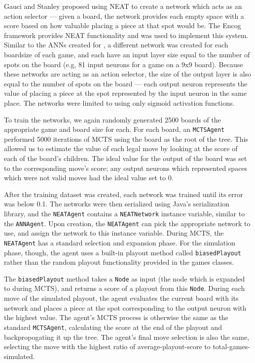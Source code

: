 Gauci and Stanley proposed using NEAT to create a network which acts as an action selector --- given a board, the network provides each empty space with a score based on how valuable placing a piece at that spot would be.  The Encog framework \cite{encog} provides NEAT functionality and was used to implement this system.  Similar to the ANNs created for \cite{ANNAgent}, a different network was created for each boardsize of each game, and each have an input layer size equal to the number of spots on the board (e.g, 81 input neurons for a game on a 9x9 board).  Because these networks are acting as an action selector, the size of the output layer is also equal to the number of spots on the board --- each output neuron represents the value of placing a piece at the spot represented by the input neuron in the same place.  The networks were limited to using only sigmoid activation functions.

To train the networks, we again randomly generated 2500 boards of the appropriate game and board size for each.  For each board, an \texttt{MCTSAgent} performed 5000 iterations of MCTS using the board as the root of the tree.  This allowed us to estimate the value of each legal move by looking at the score of each of the board's children.  The ideal value for the output of the board was set to the corresponding move's score; any output neurons which represented spaces which were not valid moves had the ideal value set to 0.  

After the training dataset was created, each network was trained until its error was below 0.1.  The networks were then serialized using Java's serialization library, and the \texttt{NEATAgent} contains a \texttt{NEATNetwork} instance variable, similar to the \texttt{ANNAgent}.  Upon creation, the \texttt{NEATAgent} can pick the appropriate network to use, and assign the network to this instance variable.  During MCTS, the \texttt{NEATAgent} has a standard selection and expansion phase.  For the simulation phase, though, the agent uses a built-in playout method called \texttt{biasedPlayout} rather than the random playout functionality provided in the games classes.

The \texttt{biasedPlayout} method takes a \texttt{Node} as input (the node which is expanded to during MCTS), and returns a score of a playout from this \texttt{Node}.  During each move of the simulated playout, the agent evaluates the current board with its network and places a piece at the spot corresponding to the output neuron with the highest value.  The agent's MCTS process is otherwise the same as the standard \texttt{MCTSAgent}, calculating the score at the end of the playout and backpropogating it up the tree.  The agent's final move selection is also the same, selecting the move with the highest ratio of average-playout-score to total-games-simulated.

